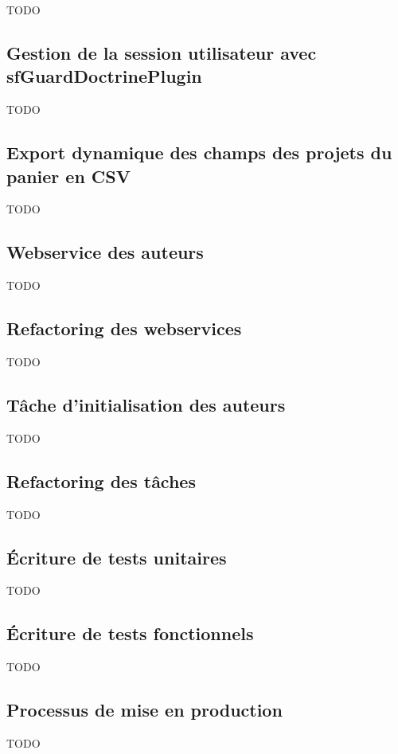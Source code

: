 TODO

\subsection{Gestion de la session utilisateur avec sfGuardDoctrinePlugin}

TODO

\subsection{Export dynamique des champs des projets du panier en CSV}

TODO

\subsection{Webservice des auteurs}

TODO

\subsection{Refactoring des webservices}

TODO

\subsection{Tâche d'initialisation des auteurs}

TODO

\subsection{Refactoring des tâches}

TODO

\subsection{Écriture de tests unitaires}

TODO

\subsection{Écriture de tests fonctionnels}

TODO

\subsection{Processus de mise en production}

TODO

